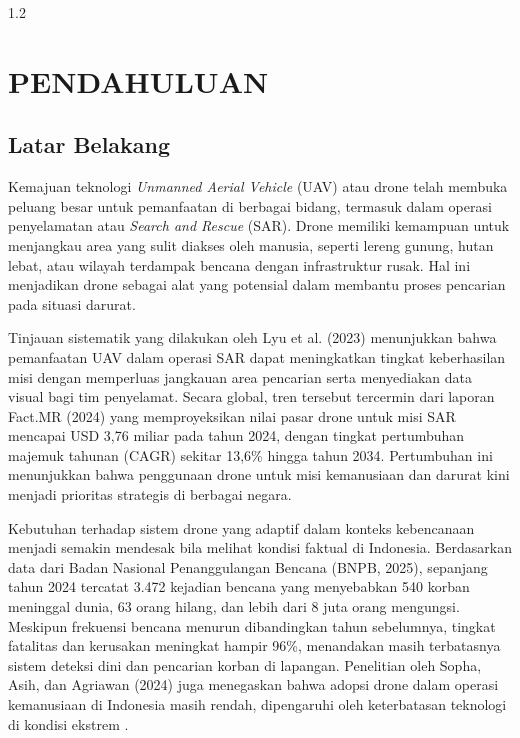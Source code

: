 \begin{spacing}{1.2}
	\chapter{PENDAHULUAN}
\end{spacing}

\vspace{4ex}

\section{Latar Belakang}
Kemajuan teknologi \textit{Unmanned Aerial Vehicle} (UAV) atau drone telah membuka peluang besar untuk pemanfaatan di berbagai bidang, termasuk dalam operasi penyelamatan atau \textit{Search and Rescue} (SAR). Drone memiliki kemampuan untuk menjangkau area yang sulit diakses oleh manusia, seperti lereng gunung, hutan lebat, atau wilayah terdampak bencana dengan infrastruktur rusak. Hal ini menjadikan drone sebagai alat yang potensial dalam membantu proses pencarian pada situasi darurat.

Tinjauan sistematik yang dilakukan oleh Lyu et al. (2023) menunjukkan bahwa pemanfaatan UAV dalam operasi SAR dapat meningkatkan tingkat keberhasilan misi dengan memperluas jangkauan area pencarian serta menyediakan data visual bagi tim penyelamat\cite{Lyu2023SARUAV}. Secara global, tren tersebut tercermin dari laporan Fact.MR (2024) yang memproyeksikan nilai pasar drone untuk misi SAR mencapai USD 3,76 miliar pada tahun 2024, dengan tingkat pertumbuhan majemuk tahunan (CAGR) sekitar 13,6\% hingga tahun 2034\cite{FactMR2024SearchRescueDroneMarket}. Pertumbuhan ini menunjukkan bahwa penggunaan drone untuk misi kemanusiaan dan darurat kini menjadi prioritas strategis di berbagai negara.

Kebutuhan terhadap sistem drone yang adaptif dalam konteks kebencanaan menjadi semakin mendesak bila melihat kondisi faktual di Indonesia. Berdasarkan data dari Badan Nasional Penanggulangan Bencana (BNPB, 2025), sepanjang tahun 2024 tercatat 3.472 kejadian bencana yang menyebabkan 540 korban meninggal dunia, 63 orang hilang, dan lebih dari 8 juta orang mengungsi. Meskipun frekuensi bencana menurun dibandingkan tahun sebelumnya, tingkat fatalitas dan kerusakan meningkat hampir 96\%, menandakan masih terbatasnya sistem deteksi dini dan pencarian korban di lapangan\cite{BNPB2024}. Penelitian oleh Sopha, Asih, dan Agriawan (2024) juga menegaskan bahwa adopsi drone dalam operasi kemanusiaan di Indonesia masih rendah, dipengaruhi oleh keterbatasan teknologi di kondisi ekstrem \cite{Sopha2024DronesHumanitarian}.


